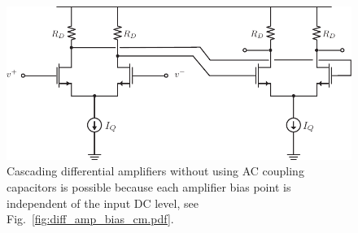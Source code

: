 \begin{figure}[tb]
\centering
\includegraphics[scale=.8]{Diff_Cascade.pdf}
\caption{Cascading differential amplifiers without using AC coupling capacitors is possible because each amplifier bias point is independent of the input DC level, see Fig.~\ref{fig:diff_amp_bias_cm.pdf}.} \label{fig:Diff_Cascade.pdf}
\end{figure}
